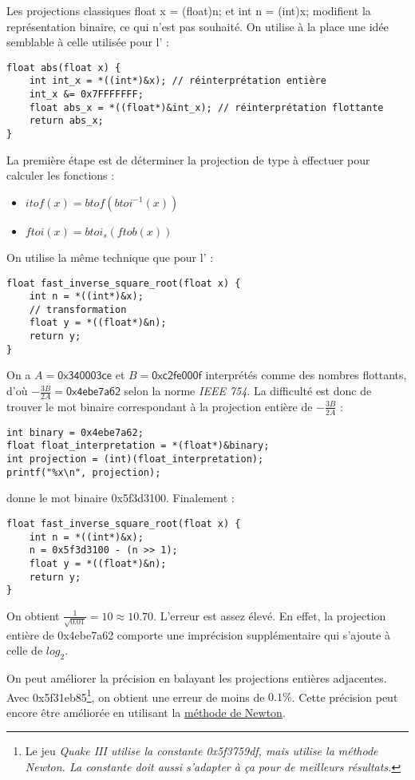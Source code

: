 \documentclass[../main.tex]{subfiles}
\begin{document}
Les projections classiques \textsf{float x = (float)n;} et \textsf{int n = (int)x;} modifient la représentation binaire, ce qui n'est pas souhaité. On utilise à la place une idée semblable à celle utilisée pour l' :
\begin{verbatim}
float abs(float x) {
	int int_x = *((int*)&x); // réinterprétation entière
	int_x &= 0x7FFFFFFF;	
	float abs_x = *((float*)&int_x); // réinterprétation flottante
	return abs_x;
}
\end{verbatim}
La première étape est de déterminer la projection de type à effectuer pour calculer les fonctions :
\begin{itemize}
	\item $itof(x) = btof(btoi^{-1}(x))$
	\item $ftoi(x) = btoi_s(ftob(x))$
\end{itemize}
On utilise la même technique que pour l' :
\begin{verbatim}
float fast_inverse_square_root(float x) {
	int n = *((int*)&x);
	// transformation
	float y = *((float*)&n);
	return y;
}
\end{verbatim}
On a $A = \textsf{0x340003ce}$ et $B = \textsf{0xc2fe000f}$ interprétés comme des nombres flottants, d'où $-\frac{3B}{2A} = \textsf{0x4ebe7a62}$ selon la norme \textit{IEEE 754}. La difficulté est donc de trouver le mot binaire correspondant à la projection entière de $-\frac{3B}{2A}$ :
\begin{verbatim}
int binary = 0x4ebe7a62;
float float_interpretation = *(float*)&binary;
int projection = (int)(float_interpretation);
printf("%x\n", projection);
\end{verbatim}
donne le mot binaire \textsf{0x5f3d3100}. Finalement :
\begin{verbatim}
float fast_inverse_square_root(float x) {
	int n = *((int*)&x);
	n = 0x5f3d3100 - (n >> 1);
	float y = *((float*)&n);
	return y;
}
\end{verbatim}
On obtient $\frac{1}{\sqrt{0.01}} = 10 \approx 10.70$. L'erreur est assez élevé. En effet, la projection entière de \textsf{0x4ebe7a62} comporte une imprécision supplémentaire qui s'ajoute à celle de $log_2$.

On peut améliorer la précision en balayant les projections entières adjacentes. Avec \textsf{0x5f31eb85}\footnote{Le jeu \textit{Quake III utilise la constante \textsf{0x5f3759df}, mais utilise la méthode Newton. La constante doit aussi s'adapter à ça pour de meilleurs résultats.}}, on obtient une erreur de moins de $0.1\%$. Cette précision peut encore être améliorée en utilisant la \href{https://fr.wikipedia.org/wiki/M%C3%A9thode_de_Newton}{méthode de Newton}. 
\end{document}
